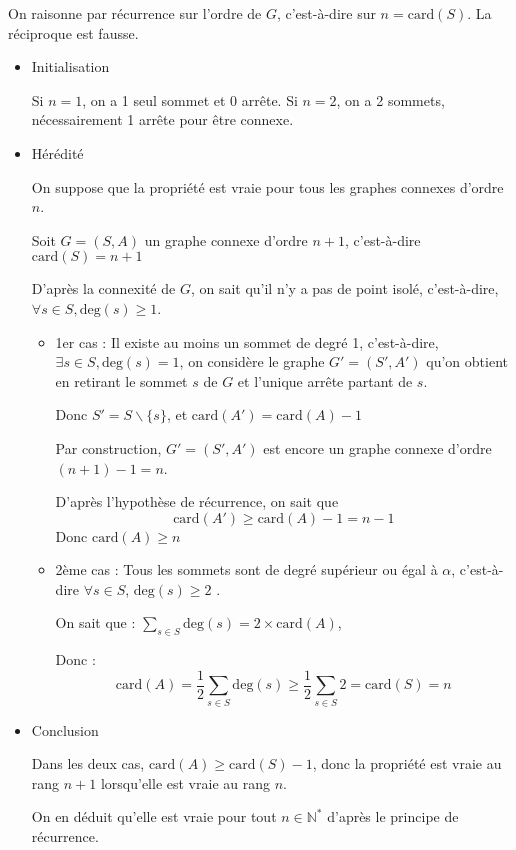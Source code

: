   \begin{myproof}
  On raisonne par récurrence sur l'ordre de $G$, c'est-à-dire sur $n = \mathrm{card} (S)$.
  La réciproque est fausse.
  \begin{itemize}
      \item Initialisation

          Si $n=1$, on a 1 seul sommet et 0 arrête.
          Si $n=2$, on a 2 sommets, nécessairement 1 arrête pour être connexe.

      \item Hérédité

          On suppose que la propriété est vraie pour tous les graphes connexes d'ordre $n$.

          Soit $G = (S,A)$ un graphe connexe d'ordre $n+1$, c'est-à-dire  $\mathrm{card} (S) = n+1$

           D'après la connexité de $G$, on sait qu'il n'y a pas de point isolé, c'est-à-dire, $\forall  s\in S, \mathrm{deg} (s) \ge 1$.

           \begin{itemize}
               \item 1er cas : Il existe au moins un sommet de degré 1, c'est-à-dire, $\exists  s \in S, \mathrm{deg} (s) = 1$, on considère le graphe $G'= (S',A')$ qu'on obtient en retirant le sommet  $s$ de $G$ et l'unique arrête partant de $s$.

                   Donc $S'= S \backslash \{s\}$, et  $\mathrm{car d}(A') = \mathrm{car d}(A) - 1 $ 

                   Par construction, $G' = (S', A')$ est encore un graphe connexe d'ordre $(n+1)-1=n$. 

                   D'après l'hypothèse de récurrence, on sait que \[
                   \mathrm{car d}(A') \ge  \mathrm{ car d}(A) - 1 = n-1  
                   \]
                   Donc $\mathrm{car d}(A) \ge n$
              \item 2ème cas : Tous les sommets sont de degré supérieur ou égal à $\alpha$, c'est-à-dire  $\forall  s \in S$, $\mathrm{deg} (s) \ge 2$ .

                  On sait que : $\sum_{s \in S} \mathrm{deg} (s) = 2\times \mathrm{car d}(A) $, 

                  Donc : \[
                  \mathrm{car d} (A) = \frac{1}{2} \sum_{s \in S} \mathrm{deg} (s) \ge  \frac{1}{2} \sum_{s \in S}2 = \mathrm{car d} (S) = n
                  \]

                  
           \end{itemize}
          \item Conclusion

              Dans les deux cas, $\mathrm{car d} (A) \ge \mathrm{car d}(S)-1 $, donc la propriété est vraie au rang $n+1$ lorsqu'elle est vraie au rang $n$.

                  On en déduit qu'elle est vraie pour tout $n \in \mathbb{N} ^{*}$ d'après le principe de récurrence.
  \end{itemize}

  \end{myproof}

